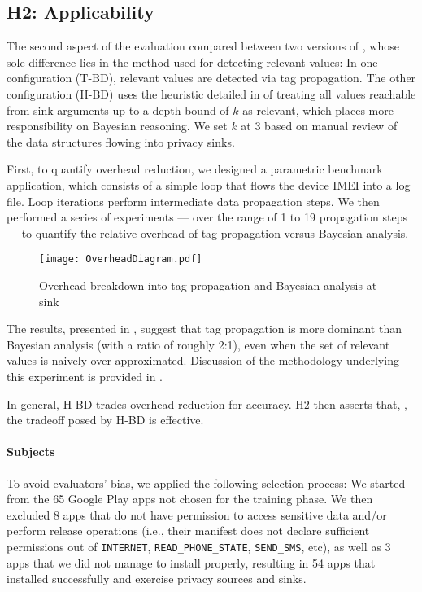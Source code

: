 \subsection{H2: Applicability}\label{Se:practical}
The second aspect of the evaluation compared between two versions of \Tool, whose sole difference lies in the method used for detecting relevant values: In one configuration (T-BD), relevant values are detected via tag propagation. The other configuration (H-BD) uses the heuristic detailed in  of treating all values reachable from sink arguments  up to a depth bound of $k$ as relevant, which places more responsibility on Bayesian reasoning. We set $k$ at 3 based on manual review of the data structures flowing into privacy sinks.

 {First, to quantify overhead reduction, we designed a parametric benchmark application, which }
consists of a simple loop that flows the device IMEI into a log file.
Loop iterations perform intermediate data propagation steps. We then performed a series of experiments --- over the range of 1 to 19 propagation steps --- to quantify the relative overhead of tag propagation versus Bayesian analysis.

\begin{figure}
\texttt{[image: OverheadDiagram.pdf]}
\caption{\label{Fi:overhead}Overhead breakdown into tag propagation and Bayesian analysis at sink}
\end{figure}

The results, presented in , suggest that  tag propagation is more dominant than  Bayesian analysis (with a ratio of roughly 2:1), even when the set of relevant values is naively over approximated. Discussion of the methodology underlying this experiment is provided in .

In general, H-BD trades overhead reduction for accuracy.
H2 then asserts that, , the tradeoff posed by H-BD is effective. 

\paragraph{Subjects} To avoid evaluators' bias, we applied the following selection process: We started from the 65 Google Play apps not chosen for the training phase. We then excluded 8 apps that do not have permission to access sensitive data and/or perform release operations (i.e., their manifest does not declare sufficient permissions out of {\tt INTERNET}, {\tt READ\_PHONE\_STATE}, {\tt SEND\_SMS}, etc), as well as 3 apps that we did not manage to install properly, resulting in 54 apps that installed successfully and exercise privacy sources and sinks.

